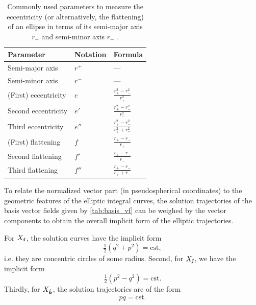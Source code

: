 \renewcommand{\arraystretch}{1.4}
\begin{table}[ht]
    \centering
    \caption{Commonly used parameters to measure the eccentricity (or alternatively, the flattening) of an ellipse in terms of its semi-major axis \(r_+\) and semi-minor axis \(r_-\) \cite{Rapp1991}.}
    \label{tab:ellipse}
    \begin{tabular}{lll}
    \toprule
        \textbf{Parameter} & \textbf{Notation} & \textbf{Formula} \\
    \midrule
        Semi-major axis & \(r^+\) & --- \\ 
        Semi-minor axis & \(r^-\) & --- \\
    \midrule
        (First) eccentricity & \(e\) & \(\displaystyle \frac{r_+^2 - r_-^2}{r_+^2}\) \\[0.3cm]
        Second eccentricity & \(e'\) & \(\displaystyle \frac{r_+^2 - r_-^2}{r_-^2}\) \\[0.3cm]
        Third eccentricity & \(e''\) & \(\displaystyle \frac{r_+^2 - r_-^2}{r_+^2 + r_-^2}\) \\[0.3cm]
    \midrule
        (First) flattening & \(f\) &   \(\displaystyle \frac{r_+ - r_-}{r_+}\) \\[0.3cm]
        Second flattening & \(f'\) &   \(\displaystyle \frac{r_+ - r_-}{r_-}\) \\[0.3cm]
        Third flattening & \(f''\) &   \(\displaystyle \frac{r_+ - r_-}{r_+ + r_-}\) \\[0.2cm]
    \bottomrule
    \end{tabular}
\end{table}
\renewcommand{\arraystretch}{1}

To relate the normalized vector part (in pseudospherical coordinates) to the geometric features of the elliptic integral curves, the solution trajectories of the basis vector fields given by \cref{tab:basis_vf} can be weighed by the vector components to obtain the overall implicit form of the elliptic trajectories.

For \(X_\quati\), the solution curves have the implicit form 
\begin{equation}
    \tfrac{1}{2}(q^2 + p^2) = \text{cst},
\end{equation}
i.e. they are concentric circles of some radius. Second, for \(X_\quatj\), we have the implicit form
\begin{equation}
    \tfrac{1}{2}(p^2 - q^2) = \text{cst}.
\end{equation}
Thirdly, for \(X_\quatk\), the solution trajectories are of the form
\begin{equation}
    pq = \text{cst}.
\end{equation}

